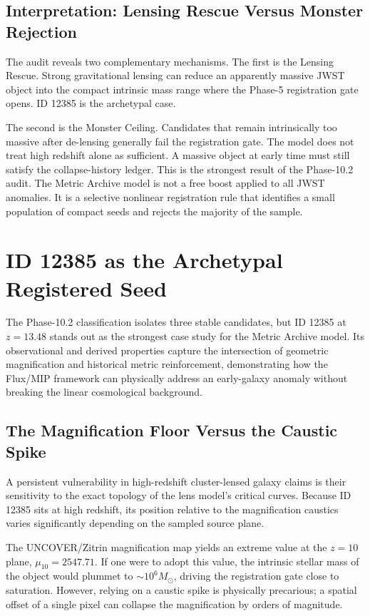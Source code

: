 \documentclass[11pt,a4paper]{article}
\newcommand{\Msun}{M_\odot}
\begin{document}
\subsection{Interpretation: Lensing Rescue Versus Monster Rejection}

The audit reveals two complementary mechanisms. The first is the Lensing Rescue. Strong gravitational lensing can reduce an apparently massive JWST object into the compact intrinsic mass range where the Phase-5 registration gate opens. ID 12385 is the archetypal case.

The second is the Monster Ceiling. Candidates that remain intrinsically too massive after de-lensing generally fail the registration gate. The model does not treat high redshift alone as sufficient. A massive object at early time must still satisfy the collapse-history ledger. This is the strongest result of the Phase-10.2 audit. The Metric Archive model is not a free boost applied to all JWST anomalies. It is a selective nonlinear registration rule that identifies a small population of compact seeds and rejects the majority of the sample.

\section{ID 12385 as the Archetypal Registered Seed}

The Phase-10.2 classification isolates three stable candidates, but ID 12385 at $z=13.48$ stands out as the strongest case study for the Metric Archive model. Its observational and derived properties capture the intersection of geometric magnification and historical metric reinforcement, demonstrating how the Flux/MIP framework can physically address an early-galaxy anomaly without breaking the linear cosmological background.

\subsection{The Magnification Floor Versus the Caustic Spike}

A persistent vulnerability in high-redshift cluster-lensed galaxy claims is their sensitivity to the exact topology of the lens model's critical curves. Because ID 12385 sits at high redshift, its position relative to the magnification caustics varies significantly depending on the sampled source plane.

The UNCOVER/Zitrin magnification map yields an extreme value at the $z=10$ plane, $\mu_{10}=2547.71$. If one were to adopt this value, the intrinsic stellar mass of the object would plummet to $\sim10^6\Msun$, driving the registration gate close to saturation. However, relying on a caustic spike is physically precarious; a spatial offset of a single pixel can collapse the magnification by orders of magnitude.
\end{document}
